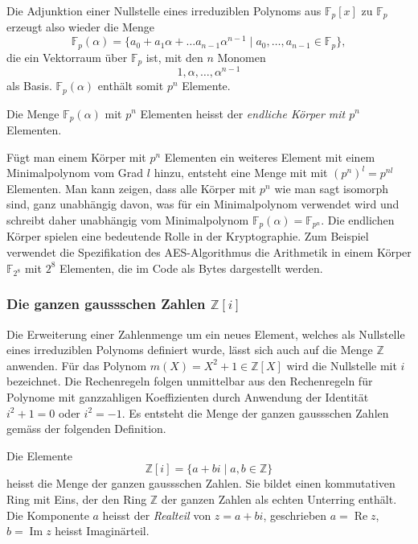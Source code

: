 Die Adjunktion einer Nullstelle eines irreduziblen Polynoms 
%
aus $\mathbb{F}_p[x]$ zu $\mathbb{F}_p$ erzeugt also wieder
die Menge 
\[
\mathbb{F}_p(\alpha)
=
\{
a_0+a_1\alpha + \dots a_{n-1}\alpha^{n-1}
\mid
a_0,\dots,a_{n-1}\in\mathbb{F}_p
\},
\]
die ein Vektorraum über $\mathbb{F}_p$ ist, mit den $n$ Monomen
\[
1, \alpha, \dots, \alpha^{n-1}
\]
als Basis.
$\mathbb{F}_p(\alpha)$ enthält somit $p^n$ Elemente.

\begin{definition}
Die Menge $\mathbb{F}_p(\alpha)$ mit $p^n$ Elementen heisst der
\emph{endliche Körper mit $p^n$} Elementen.
%
%
\end{definition}

Fügt man einem Körper mit $p^n$ Elementen ein weiteres Element mit
einem Minimalpolynom vom Grad $l$ hinzu, entsteht eine Menge mit
mit $(p^n)^l=p^{nl}$ Elementen.
Man kann zeigen, dass alle Körper mit $p^n$ wie man sagt isomorph sind,
ganz unabhängig davon, was für ein Minimalpolynom verwendet wird
und schreibt daher unabhängig vom Minimalpolynom
$\mathbb{F}_p(\alpha)=\mathbb{F}_{p^n}$.
Die endlichen Körper spielen eine bedeutende Rolle in der Kryptographie.
Zum Beispiel verwendet die Spezifikation des AES-Algorithmus die 
%
Arithmetik in einem Körper $\mathbb{F}_{2^8}$ mit $2^8$ Elementen,
die im Code als Bytes dargestellt werden.

%
%
\subsubsection{Die ganzen gaussschen Zahlen $\mathbb{Z}[i]$}
%
Die Erweiterung einer Zahlenmenge um ein neues Element, welches als
Nullstelle eines irreduziblen Polynoms definiert wurde, lässt sich
auch auf die Menge $\mathbb{Z}$ anwenden.
Für das Polynom $m(X) = X^2+1\in\mathbb{Z}[X]$ wird die Nullstelle
mit $i$ bezeichnet.
Die Rechenregeln folgen unmittelbar aus den Rechenregeln für
Polynome mit ganzzahligen Koeffizienten durch Anwendung der
Identität $i^2+1=0$ oder $i^2=-1$.
Es entsteht die Menge der ganzen gaussschen Zahlen gemäss der
folgenden Definition.

\begin{definition}
%
Die Elemente
\[
\mathbb{Z}[i]
=
\{
a+bi
\mid
a,b\in\mathbb{Z}
\}
\]
heisst die Menge der ganzen gaussschen Zahlen.
Sie bildet einen kommutativen Ring mit Eins, der den Ring $\mathbb{Z}$
der ganzen Zahlen als echten Unterring enthält.
Die Komponente $a$ heisst der \emph{Realteil} von $z=a+bi$, geschrieben
$a=\operatorname{Re}z$, $b=\operatorname{Im}z$ heisst Imaginärteil.
\end{definition}

